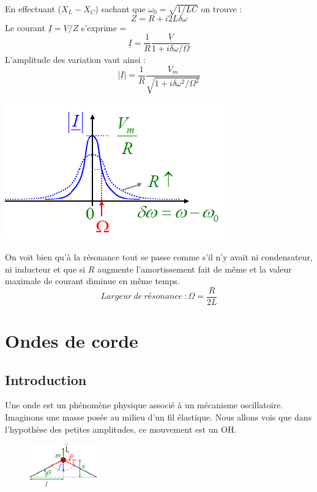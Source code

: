 \documentclass	[11pt, a4paper, openany]{book}
\begin{document}
En effectuant ($X_L - X_C$) sachant que $\omega_0 = \sqrt{1/LC}$ on trouve :
\begin{equation}
Z = R + i2L\delta\omega
\end{equation}
Le courant $\underline{I} = \underline{V}/Z$ s'exprime =
\begin{equation}
\underline{I} = \frac{1}{R}\frac{\underline{V}}{1+i\delta\omega/\Omega}
\end{equation}
L'amplitude des variation vaut ainsi :
\begin{equation}
|\underline{I}| = \frac{1}{R}\frac{V_m}{\sqrt{1+i\delta\omega^2/\Omega^2}}
\end{equation}

\begin{center}
\includegraphics[scale=0.5]{oo/image21.png}
\end{center}
On voit bien qu'à la résonance tout se passe comme s'il n'y avait ni condensateur, ni inducteur et que si $R$ augmente l'amortissement fait de même et la valeur maximale de courant diminue en même temps.
\begin{equation}
Largeur\ de\ résonance\ : \Omega = \frac{R}{2L}
\end{equation}

\section{Ondes de corde}
\subsection{Introduction}
Une onde est un phénomène physique associé à un mécanisme oscillatoire. Imaginons une masse posée au milieu d'un fil élastique. Nous allons vois que dans l'hypothèse des petites amplitudes, ce mouvement est un OH.\\

\begin{figure}
\includegraphics[width=3cm]{oo/image22.png}
\end{figure}
\end{document}
